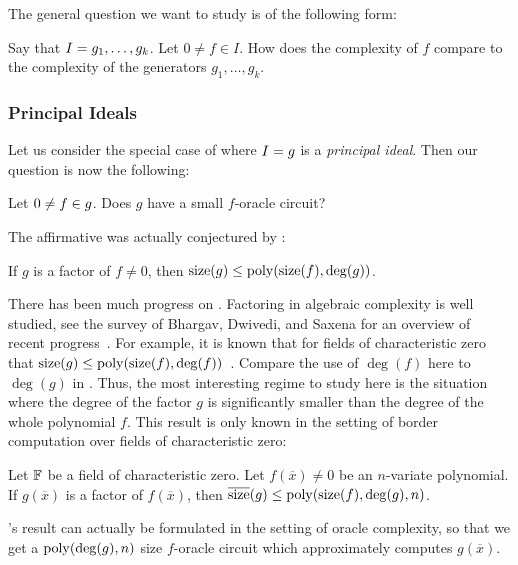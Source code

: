 \documentclass[letterpaper, 11pt]{amsart}
\newif\iffull
\begin{document}
\iffull
\clearpage
\fi

The general question we want to study is of the following form:
\begin{question}\label{question:general_ideal}
  Say that $I = \ideal{g_1, \ldots, g_k}$.
  Let $0 \neq f \in I$.
  How does the complexity of $f$ compare to the complexity of the generators $g_1, \ldots, g_k$.
\end{question}

\subsubsection{Principal Ideals}

Let us consider the special case of  where $I = \ideal{g}$ is a \emph{principal ideal}.
Then our question is now the following:
\begin{question}\label{question:principal_ideal}
  Let $0 \neq f \in \ideal{g}$.
  Does $g$ have a small $f$-oracle circuit?
\end{question}

The affirmative was actually conjectured by \Burgisser:
\begin{conj}\label{conj:factor}
  If $g$ is a factor of $f \neq 0$, then $\operatorname{size}(g) \leq \operatorname{poly}(\operatorname{size}(f), \deg(g))$.
\end{conj}

There has been much progress on .
Factoring in algebraic complexity is well studied, see the survey of Bhargav, Dwivedi, and Saxena for an overview of recent progress~\cite{BDS26}.
For example, it is known that for fields of characteristic zero that $\operatorname{size}(g) \leq \operatorname{poly}(\operatorname{size}(f), \deg(f))$~\cite{Kal87, Bur00}.
Compare the use of $\deg(f)$ here to $\deg(g)$ in .
Thus, the most interesting regime to study here is the situation where the degree of the factor $g$ is significantly smaller than the degree of the whole polynomial $f$.
This result is only known in the setting of border computation over fields of characteristic zero:
\begin{thrm}
  Let $\mathbb{F}$ be a field of characteristic zero.
  Let $f(\overline{x}) \neq 0$ be an $n$-variate polynomial.
  If $g(\overline{x})$ is a factor of $f(\overline{x})$, then $\overline{\operatorname{size}}(g) \leq \operatorname{poly}(\operatorname{size}(f), \deg(g), n)$.
\end{thrm}
\Burgisser's result can actually be formulated in the setting of oracle complexity, so that we get a $\operatorname{poly}(\deg(g), n)$ size $f$-oracle circuit which approximately computes $g(\overline{x})$.
\end{document}
